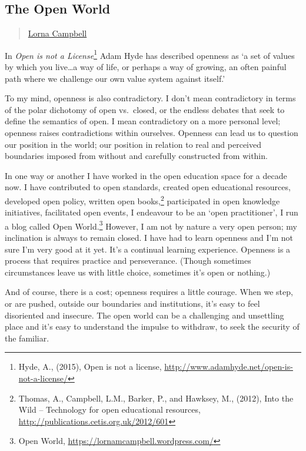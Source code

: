 \subsection{The Open World}\label{the-open-world}

\begin{quote}
\href{../appendix/attributions.html\#lorna-campbell}{Lorna Campbell}
\end{quote}

In \emph{Open is not a License}\footnote{Hyde, A., (2015), Open is not a
  license, \url{http://www.adamhyde.net/open-is-not-a-license/}} Adam
Hyde has described openness as `a set of values by which you
live\ldots{}a way of life, or perhaps a way of growing, an often painful
path where we challenge our own value system against itself.'

To my mind, openness is also contradictory. I don't mean contradictory
in terms of the polar dichotomy of open vs.~closed, or the endless
debates that seek to define the semantics of open. I mean contradictory
on a more personal level; openness raises contradictions within
ourselves. Openness can lead us to question our position in the world;
our position in relation to real and perceived boundaries imposed from
without and carefully constructed from within.

In one way or another I have worked in the open education space for a
decade now. I have contributed to open standards, created open
educational resources, developed open policy, written open
books,\footnote{Thomas, A., Campbell, L.M., Barker, P., and Hawksey, M.,
  (2012), Into the Wild -- Technology for open educational resources,
  \url{http://publications.cetis.org.uk/2012/601}} participated in open
knowledge initiatives, facilitated open events, I endeavour to be an
`open practitioner', I run a blog called Open World.\footnote{Open
  World, \url{https://lornamcampbell.wordpress.com/}} However, I am not
by nature a very open person; my inclination is always to remain closed.
I have had to learn openness and I'm not sure I'm very good at it yet.
It's a continual learning experience. Openness is a process that
requires practice and perseverance. (Though sometimes circumstances
leave us with little choice, sometimes it's open or nothing.)

And of course, there is a cost; openness requires a little courage. When
we step, or are pushed, outside our boundaries and institutions, it's
easy to feel disoriented and insecure. The open world can be a
challenging and unsettling place and it's easy to understand the impulse
to withdraw, to seek the security of the familiar.

